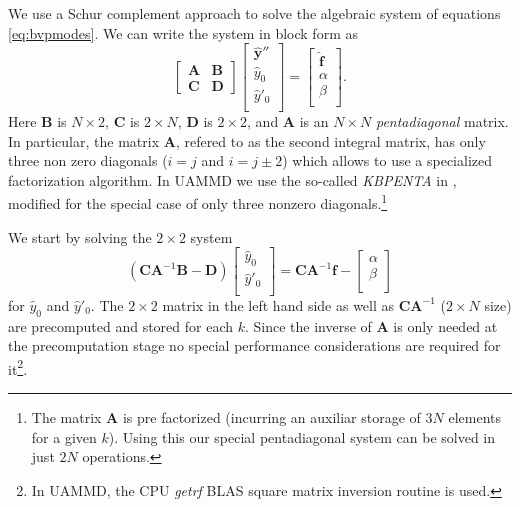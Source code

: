 \documentclass[ twoside,openright,titlepage,numbers=noenddot,%
headinclude,footinclude,cleardoublepage=empty,abstract=on,
BCOR=5mm,paper=a4,fontsize=11pt, dvipsnames
]{scrreprt}
\newcommand{\uammd}{\gls{UAMMD}\xspace}
\newcommand{\fou}[1]{\widehat{#1}}
\begin{document}
We use a Schur complement approach to solve the algebraic system of equations \eqref{eq:bvpmodes}. We can write the system in block form as 
\begin{equation}
\label{eq:blocksys}
\begin{bmatrix} \bm{A} & \bm{B} \\[2 pt] \bm{C} & \bm{D} \end{bmatrix}
\begin{bmatrix} \fou{\bm{y}}''\\ \fou{y}_0 \\ \fou{y}'_0 \\ \end{bmatrix}
= \begin{bmatrix}  \fou{\bm{f}}\\ \alpha \\ \beta\\ \end{bmatrix}. 
\end{equation}
Here $\bm{B}$ is $N \times 2$, $\bm{C}$ is $2 \times N$, $\bm{D}$ is $2 \times 2$, and $\bm{A}$ is an $N \times N$ \textit{pentadiagonal} matrix. In particular, the matrix $\bm{A}$, refered to as the second integral matrix, has only three non zero diagonals ($i=j$ and $i = j\pm 2$) which allows to use a specialized factorization algorithm. In \uammd we use the so-called \emph{KBPENTA} in \cite{Karawia2010}, modified for the special case of only three nonzero diagonals.\footnote{The matrix $\bm{A}$ is pre factorized (incurring an auxiliar storage of $3N$ elements for a given $k$). Using this our special pentadiagonal system can be solved in just $2N$ operations.} 

We start by solving the $2 \times 2$ system
\begin{equation}
(\bm{C}\bm{A}^{-1}\bm{B}-\bm{D})\begin{bmatrix}  \fou{y}_0 \\ \fou{y}'_0\\ \end{bmatrix} = \bm{C}\bm{A}^{-1}\bm{f}-\begin{bmatrix}  \alpha \\ \beta\\ \end{bmatrix}
\end{equation}
for $\fou{y}_0$ and $\fou{y}'_0$. The $2\times 2$ matrix in the left hand side as well as $\bm{C}\bm{A}^{-1}$ ($2\times N$ size) are precomputed and stored for each $k$. Since the inverse of $\bm{A}$ is only needed at the precomputation stage no special performance considerations are required for it\footnote{In \uammd, the CPU \emph{getrf} BLAS square matrix inversion routine is used.}.
\end{document}
